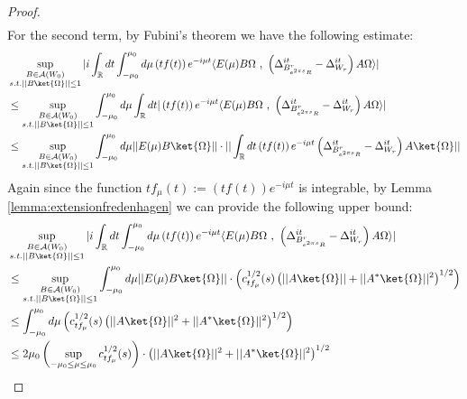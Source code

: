 \documentclass[a4paper,11pt]{article}
\theoremstyle{definition}
\newcommand{\lb}{\left(}
\newcommand{\rb}{\right)}
\begin{document}
\begin{proof}
\begin{align}
    \end{align}
    For the second term, by Fubini's theorem we have the following estimate:
    \begin{align}
        \begin{split}
            &\sup_{\substack{B\in\mathcal{A}(W_0)\\s.t.||B\ket{\Omega}||\leq 1}}|i\int_\mathbb{R} dt \int_{-\mu_0}^{\mu_0}d\mu \lb tf(t)\rb e^{-i\mu t}\langle E(\mu)B\Omega\text{ , }\lb\Delta^{it}_{B^r_{e^{2\pi s}R}} - \Delta^{it}_{W_r}\rb A\Omega \rangle|
            \\&
            \leq \sup_{\substack{B\in\mathcal{A}(W_0)\\s.t.||B\ket{\Omega}||\leq 1}}\int_{-\mu_0}^{\mu_0}d\mu\int_\mathbb{R} dt |\lb tf(t)\rb e^{-i\mu t}\langle E(\mu)B\Omega\text{ , }\lb \Delta^{it}_{B^r_{e^{2\pi s}R}} - \Delta^{it}_{W_r} \rb A\Omega \rangle|
            \\&
            \leq \sup_{\substack{B\in\mathcal{A}(W_0)\\s.t.||B\ket{\Omega}||\leq 1}}\int_{-\mu_0}^{\mu_0}d\mu ||E(\mu) B\ket{\Omega}||\cdot||\int_\mathbb{R} dt\lb tf(t) \rb e^{-i\mu t}\lb\Delta^{it}_{B^r_{e^{2\pi s}R}}- \Delta^{it}_{W_r}\rb A\ket{\Omega}||
        \end{split}
    \end{align}
    Again since the function $tf_\mu(t):= \lb tf(t) \rb e^{-i\mu t}$ is integrable, by Lemma \ref{lemma:extensionfredenhagen} we can provide the following upper bound:
    \begin{align}
        \begin{split}
            &\sup_{\substack{B\in\mathcal{A}(W_0)\\s.t.||B\ket{\Omega}||\leq 1}}|i\int_\mathbb{R} dt \int_{-\mu_0}^{\mu_0}d\mu \lb tf(t)\rb e^{-i\mu t}\langle E(\mu)B\Omega\text{ , }\lb\Delta^{it}_{B^r_{e^{2\pi s}R}} - \Delta^{it}_{W_r}\rb A\Omega \rangle|
            \\&
            \leq \sup_{\substack{B\in\mathcal{A}(W_0)\\s.t.||B\ket{\Omega}||\leq 1}}\int_{-\mu_0}^{\mu_0}d\mu ||E(\mu)B\ket{\Omega}||\cdot\lb c^{1/2}_{t f_\mu}(s)\lb||A\ket{\Omega}|| + ||A^*\ket{\Omega}||^2\rb^{1/2}\rb
            \\&
            \leq \int_{-\mu_0}^{\mu_0}d\mu \lb c^{1/2}_{tf_\mu}(s)\lb||A\ket{\Omega}||^2 + ||A^*\ket{\Omega}||^2\rb^{1/2}\rb 
            \\&
            \leq 2\mu_0\lb\sup_{-\mu_0\leq \mu\leq \mu_0}c^{1/2}_{tf_\mu}(s)\rb\cdot\lb||A\ket{\Omega}||^2 + ||A^*\ket{\Omega}||^2\rb^{1/2}

\end{split}
\end{align}
\end{proof}
\end{document}
